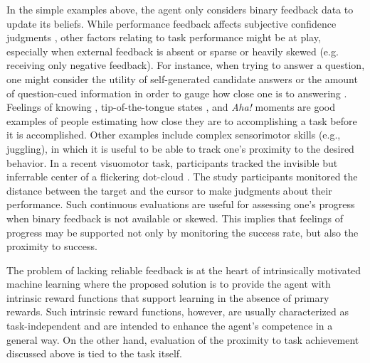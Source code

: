 In the simple examples above, the agent only considers binary feedback data to update its beliefs. While performance feedback affects subjective confidence judgments \parencite{marti_certainty_2018,rouault_forming_2019}, other factors relating to task performance might be at play, especially when external feedback is absent or sparse \parencite[e.g.,][]{rouault_forming_2019,holm_episodic_2019,locke_performance_2020} or heavily skewed (e.g. receiving only negative feedback). For instance, when trying to answer a question, one might consider the utility of self-generated candidate answers or the amount of question-cued information in order to gauge how close one is to answering \parencite[see][]{coenen_asking_2019}. Feelings of knowing \parencite{koriat_how_1993}, tip-of-the-tongue states \parencite{schwartz_tip---tongue_2011}, and \emph{Aha!} moments \parencite{dubey_aha_2021} are good examples of people estimating how close they are to accomplishing a task before it is accomplished. Other examples include complex sensorimotor skills (e.g., juggling), in which it is useful to be able to track one's proximity to the desired behavior. In a recent visuomotor task, participants tracked the invisible but inferrable center of a flickering dot-cloud \parencite{locke_performance_2020}. The study participants monitored the distance between the target and the cursor to make judgments about their performance. Such continuous evaluations are useful for assessing one's progress when binary feedback is not available or skewed. This implies that feelings of progress may be supported not only by monitoring the success rate, but also the proximity to success.

The problem of lacking reliable feedback is at the heart of intrinsically motivated machine learning \cite{oudeyer_computational_2018,linke_adapting_2020} where the proposed solution is to provide the agent with intrinsic reward functions that support learning in the absence of primary rewards. Such intrinsic reward functions, however, are usually characterized as task-independent and are intended to enhance the agent's competence in a general way. On the other hand, evaluation of the proximity to task achievement discussed above is tied to the task itself.

